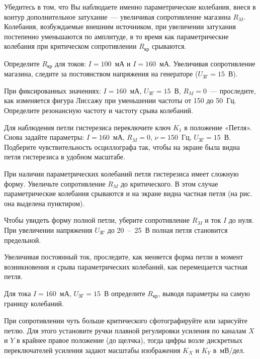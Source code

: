 \begin{lab:task}
\item
Убедитесь в том, что Вы наблюдаете именно параметрические колебания, внеся в
контур дополнительное затухание~--- увеличивая сопротивление магазина $R_M$.
Колебания, возбуждаемые внешним источником, при увеличении затухания постепенно
уменьшаются по амплитуде, в то время как параметрические колебания при
критическом сопротивлении $R_\text{кр}$ срываются.

\item
Определите $R_\text{кр}$ для токов: $I = 100$~мА и $I = 160$~мА. Увеличивая
сопротивление магазина, следите за постоянством напряжения на генераторе
($U_\text{ЗГ} = 15$~В).

\item
При фиксированных значениях: $I = 160$~мА, $U_\text{ЗГ} = 15$~В, $R_M = 0$~---
проследите, как изменяется фигура Лиссажу при уменьшении частоты от 150 до
50~Гц. Определите резонансную частоту и частоту срыва колебаний.

\item
Для наблюдения петли гистерезиса переключите ключ $K_1$ в положение «Петля».
Снова задайте параметры: $I = 160$~мА, $R_M = 0$, $\nu = 150$~Гц, $U_\text{ЗГ} =
15$~В. Подберите чувствительность осциллографа так, чтобы на экране была видна
петля гистерезиса в удобном масштабе.

При наличии параметрических колебаний петля гистерезиса имеет сложную форму.
Увеличьте сопротивление $R_M$ до критического. В этом случае параметрические
колебания срываются и на экране видна частная петля (на рис.~ она выделена пунктиром).

Чтобы увидеть форму полной петли, уберите сопротивление $R_M$ и ток $I$ до нуля.
При увеличении напряжения $U_\text{ЗГ}$ до 20~--~25~В полная петля становится
предельной.

\item
Увеличивая постоянный ток, проследите, как меняется форма петли в момент
возникновения и срыва параметрических колебаний, как перемещается частная петля.

\item
Для тока $I = 160$~мА, $U_\text{ЗГ} = 15$~В определите $R_\text{кр}$, выводя
параметры на самую границу колебаний.

\item
При сопротивлении чуть больше критического сфотографируйте или зарисуйте петлю.
Для этого установите
ручки плавной регулировки усиления по каналам $X$ и $Y$ в крайнее правое
положение (до щелчка), тогда цифры возле дискретных переключателей усиления
задают масштабы изображения $K_X$ и $K_Y$ в~мВ/дел.


\end{lab:task}

